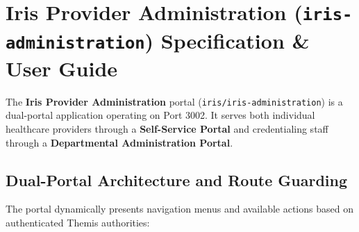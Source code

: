 \section{Iris Provider Administration (\texttt{iris-administration}) Specification \& User Guide}
\label{sec:iris_admin_guide}

The \textbf{Iris Provider Administration} portal (\texttt{iris/iris-administration}) is a dual-portal application operating on Port 3002. It serves both individual healthcare providers through a \textbf{Self-Service Portal} and credentialing staff through a \textbf{Departmental Administration Portal}.

\subsection{Dual-Portal Architecture and Route Guarding}

The portal dynamically presents navigation menus and available actions based on authenticated Themis authorities:

